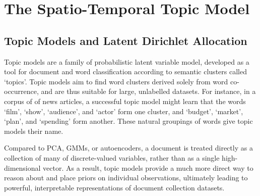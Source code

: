 \chapter{The Spatio-Temporal Topic Model} \label{ch:topic-models-detail}

\section{Topic Models and Latent Dirichlet Allocation}


Topic models are a family of probabilistic latent variable model, developed as a tool for document and word classification according to semantic clusters called `topics'. Topic models aim to find word clusters derived solely from word co-occurrence, and are thus suitable for large, unlabelled datasets. For instance, in a corpus of of news articles, a successful topic model might learn that the words `film', `show', `audience', and `actor' form one cluster, and `budget', `market', `plan', and `spending' form another. These natural groupings of words give topic models their name.

Compared to PCA, GMMs, or autoencoders, a document is treated directly as a collection of many of discrete-valued variables, rather than as a single high-dimensional vector. As a result, topic models provide a much more direct way to reason about and place priors on individual observations, ultimately leading to powerful, interpretable representations of document collection datasets.

